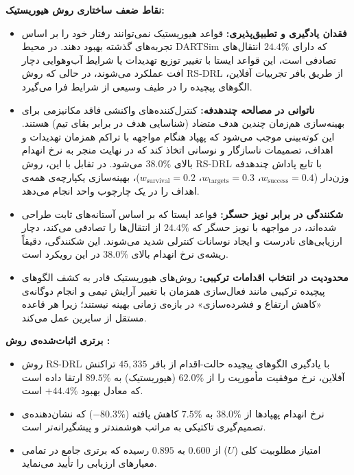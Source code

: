 \documentclass[oneside,openany,a4paper,12pt]{article}
\begin{document}
\textbf{نقاط ضعف ساختاری روش هیوریستیک:}
\begin{itemize}
    \item \textbf{فقدان یادگیری و تطبیق‌پذیری:} قواعد هیوریستیک نمی‌توانند رفتار خود را بر اساس تجربه‌های گذشته بهبود دهند. در محیط DARTSim که دارای $24.4\%$ انتقال‌های تصادفی است، این قواعد ایستا با تغییر توزیع تهدیدات یا شرایط آب‌وهوایی دچار افت عملکرد می‌شوند، در حالی که روش RS-DRL از طریق بافر تجربیات آفلاین، الگوهای پیچیده را در طیف وسیعی از شرایط فرا می‌گیرد.
    \item \textbf{ناتوانی در مصالحه چندهدفه:} کنترل‌کننده‌های واکنشی فاقد مکانیزمی برای بهینه‌سازی هم‌زمان چندین هدف متضاد (شناسایی هدف در برابر بقای تیم) هستند. این کوته‌بینی موجب می‌شود که پهپاد هنگام مواجهه با تراکم همزمان تهدیدات و اهداف، تصمیمات ناسازگار و نوسانی اتخاذ کند که در نهایت منجر به نرخ انهدام بالای $38.0\%$ می‌شود. در تقابل با این، روش RS-DRL با تابع پاداش چندهدفه وزن‌دار ($w_\text{success}=0.4$، $w_\text{targets}=0.3$، $w_\text{survival}=0.2$)، بهینه‌سازی یکپارچه‌ی همه‌ی اهداف را در یک چارچوب واحد انجام می‌دهد.
    \item \textbf{شکنندگی در برابر نویز حسگر:} قواعد ایستا که بر اساس آستانه‌های ثابت طراحی شده‌اند، در مواجهه با نویز حسگر که $24.4\%$ از انتقال‌ها را تصادفی می‌کند، دچار ارزیابی‌های نادرست و ایجاد نوسانات کنترلی شدید می‌شوند. این شکنندگی، دقیقاً ریشه‌ی نرخ انهدام بالای $38.0\%$ در این رویکرد است.
    \item \textbf{محدودیت در انتخاب اقدامات ترکیبی:} روش‌های هیوریستیک قادر به کشف الگوهای پیچیده ترکیبی مانند فعال‌سازی همزمان  با تغییر آرایش تیمی و انجام دوگانه‌ی «کاهش ارتفاع و فشرده‌سازی» در بازه‌ی زمانی بهینه نیستند؛ زیرا هر قاعده مستقل از سایرین عمل می‌کند.
\end{itemize}

\textbf{برتری اثبات‌شده‌ی روش :}
\begin{itemize}
    \item روش RS-DRL با یادگیری الگوهای پیچیده حالت-اقدام از بافر $45{,}335$ تراکنش آفلاین، نرخ موفقیت مأموریت را از $62.0\%$ (هیوریستیک) به $89.5\%$ ارتقا داده است که معادل بهبود $+44.4\%$ است.
    \item نرخ انهدام پهپادها از $38.0\%$ به $7.5\%$ کاهش یافته ($-80.3\%$) که نشان‌دهنده‌ی تصمیم‌گیری تاکتیکی به مراتب هوشمندتر و پیشگیرانه‌تر است.
    \item امتیاز مطلوبیت کلی ($U$) از $0.600$ به $0.895$ رسیده که برتری جامع در تمامی معیارهای ارزیابی را تأیید می‌نماید.
\end{itemize}
\end{document}
